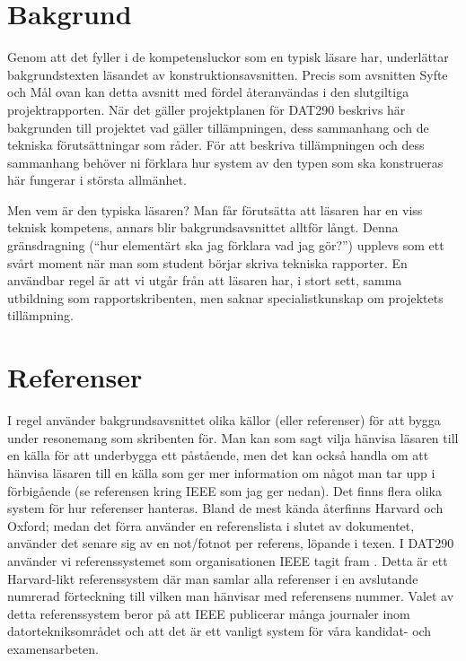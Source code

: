 \documentclass[a4paper]{article}
\begin{document}
\section{Bakgrund}


Genom att det fyller i de kompetensluckor som en typisk läsare har,
underlättar bakgrundstexten läsandet av konstruktionsavsnitten. Precis
som avsnitten Syfte och Mål ovan kan detta avsnitt med fördel
återanvändas i den slutgiltiga projektrapporten. När det gäller
projektplanen för DAT290 beskrivs här bakgrunden till projektet vad
gäller tillämpningen, dess sammanhang och de tekniska förutsättningar
som råder. För att beskriva tillämpningen och dess sammanhang behöver ni
förklara hur system av den typen som ska konstrueras här fungerar i
största allmänhet.

Men vem är den typiska läsaren? Man får förutsätta att läsaren har en
viss teknisk kompetens, annars blir bakgrundsavsnittet alltför långt.
Denna gränsdragning (“hur elementärt ska jag förklara vad jag gör?”)
upplevs som ett svårt moment när man som student börjar skriva tekniska
rapporter. En användbar regel är att vi utgår från att läsaren har, i
stort sett, samma utbildning som rapportskribenten, men saknar
specialistkunskap om projektets tillämpning.


\section{Referenser}

I regel använder bakgrundsavsnittet olika källor (eller referenser) för
att bygga under resonemang som skribenten för. Man kan som sagt vilja
hänvisa läsaren till en källa för att underbygga ett påstående, men det
kan också handla om att hänvisa läsaren till en källa som ger mer
information om något man tar upp i förbigående (se referensen kring IEEE
som jag ger nedan). Det finns flera olika system för hur referenser
hanteras. Bland de mest kända återfinns Harvard och Oxford; medan det
förra använder en referenslista i slutet av dokumentet, använder det
senare sig av en not/fotnot per referens, löpande i texen. I DAT290
använder vi referenssystemet som organisationen IEEE tagit fram . Detta
är ett Harvard-likt referenssystem där man samlar alla referenser i en
avslutande numrerad förteckning till vilken man hänvisar med referensens
nummer. Valet av detta referenssystem beror på att IEEE publicerar många
journaler inom datortekniksområdet och att det är ett vanligt system för
våra kandidat- och examensarbeten.
\end{document}
